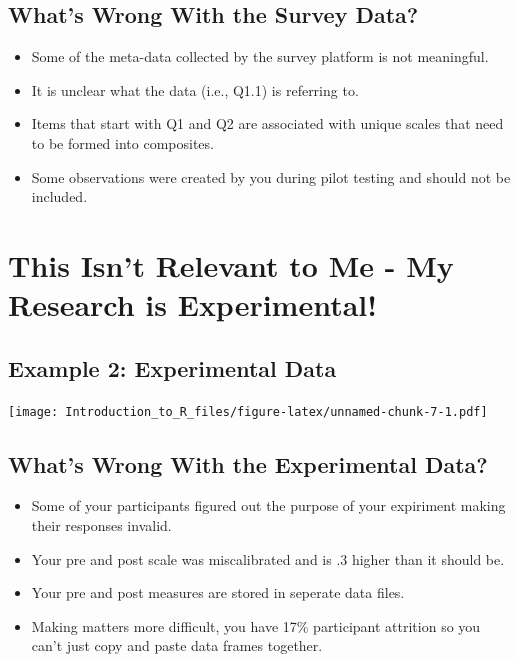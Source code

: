 \documentclass[]{book}
\providecommand{\tightlist}{%
  \setlength{\itemsep}{0pt}\setlength{\parskip}{0pt}}
\theoremstyle{definition}
\theoremstyle{definition}
\theoremstyle{definition}
\theoremstyle{remark}
\begin{document}
\hypertarget{whats-wrong-with-the-survey-data}{%
\subsection{What's Wrong With the Survey Data?}\label{whats-wrong-with-the-survey-data}}

\begin{itemize}
\tightlist
\item
  Some of the meta-data collected by the survey platform is not meaningful.
\item
  It is unclear what the data (i.e., Q1.1) is referring to.
\item
  Items that start with Q1 and Q2 are associated with unique scales that need to be formed into composites.
\item
  Some observations were created by you during pilot testing and should not be included.
\end{itemize}

\hypertarget{this-isnt-relevant-to-me---my-research-is-experimental}{%
\section{This Isn't Relevant to Me - My Research is Experimental!}\label{this-isnt-relevant-to-me---my-research-is-experimental}}

\hypertarget{example-2-experimental-data}{%
\subsection{Example 2: Experimental Data}\label{example-2-experimental-data}}

\texttt{[image: Introduction\_to\_R\_files/figure-latex/unnamed-chunk-7-1.pdf]}

\hypertarget{whats-wrong-with-the-experimental-data}{%
\subsection{What's Wrong With the Experimental Data?}\label{whats-wrong-with-the-experimental-data}}

\begin{itemize}
\tightlist
\item
  Some of your participants figured out the purpose of your expiriment making their responses invalid.
\item
  Your pre and post scale was miscalibrated and is .3 higher than it should be.
\item
  Your pre and post measures are stored in seperate data files.
\item
  Making matters more difficult, you have 17\% participant attrition so you can't just copy and paste data frames together.
\end{itemize}
\end{document}
